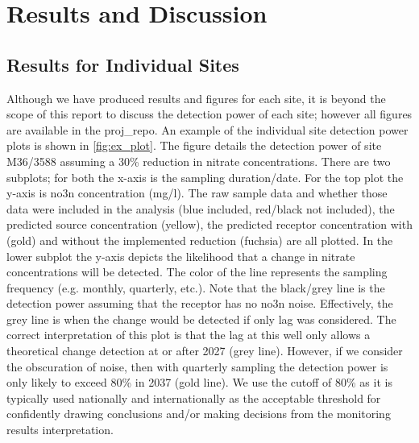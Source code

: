 
\section[Results and Discussion]{Results and Discussion} \label{sec:results}

\subsection[Site Results]{Results for Individual Sites} \label{sec:site_results}

Although we have produced results and figures for each site, it is beyond the scope of this report to discuss the detection power of each site; however all figures are available in the \gls{proj_repo}.
An example of the individual site detection power plots is shown in \autoref{fig:ex_plot}.
The figure details the detection power of site M36/3588 assuming a 30\% reduction in nitrate concentrations.
There are two subplots; for both the x-axis is the sampling duration/date.
For the top plot the y-axis is \gls{no3n} concentration (mg/l).
The raw sample data and whether those data were included in the analysis (blue included, red/black not included), the predicted source concentration (yellow), the predicted receptor concentration with (gold) and without the implemented reduction (fuchsia) are all plotted.
In the lower subplot the y-axis depicts the likelihood that a change in nitrate concentrations will be detected.
The color of the line represents the sampling frequency (e.g. monthly, quarterly, etc.).
Note that the black/grey line is the detection power assuming that the receptor has no \gls{no3n} noise.
Effectively, the grey line is when the change would be detected if only lag was considered.
The correct interpretation of this plot is that the lag at this well only allows a theoretical change detection at or after 2027 (grey line).
However, if we consider the obscuration of noise, then with quarterly sampling the detection power is only likely to exceed 80\% in 2037 (gold line).
We use the cutoff of 80\% as it is typically used nationally and internationally as the acceptable threshold for confidently drawing conclusions and/or making decisions from the monitoring results interpretation\citep{dumont_determining_nodate}.


